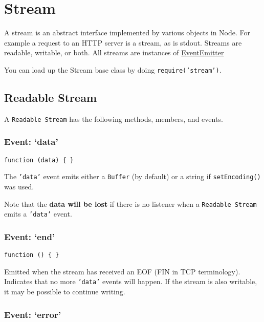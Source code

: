 \section{Stream}

\begin{Shaded}
\begin{Highlighting}[]
\NormalTok{: } 
\end{Highlighting}
\end{Shaded}

A stream is an abstract interface implemented by various objects in
Node. For example a request to an HTTP server is a stream, as is stdout.
Streams are readable, writable, or both. All streams are instances of
\href{events.html\#events\_class\_events\_eventemitter}{EventEmitter}

You can load up the Stream base class by doing
\texttt{require('stream')}.

\subsection{Readable Stream}

A \texttt{Readable Stream} has the following methods, members, and
events.

\subsubsection{Event: `data'}

\texttt{function (data) \{ \}}

The \texttt{'data'} event emits either a \texttt{Buffer} (by default) or
a string if \texttt{setEncoding()} was used.

Note that the \textbf{data will be lost} if there is no listener when a
\texttt{Readable Stream} emits a \texttt{'data'} event.

\subsubsection{Event: `end'}

\texttt{function () \{ \}}

Emitted when the stream has received an EOF (FIN in TCP terminology).
Indicates that no more \texttt{'data'} events will happen. If the stream
is also writable, it may be possible to continue writing.

\subsubsection{Event: `error'}


